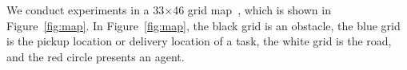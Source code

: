 \documentclass[sigconf,anonymous]{aamas}
\begin{document}
We conduct experiments in a 33$\times$46 grid map~\cite{ma2017lifelong,ma2019lifelong},
which is shown in Figure~\ref{fig:map}.
In Figure~\ref{fig:map}, the black grid is an obstacle,
the blue grid is the pickup location or delivery location of a task,
the white grid is the road,
and the red circle presents an agent.


\begin{figure}[htbp]
  \centering



\end{figure}
\end{document}
